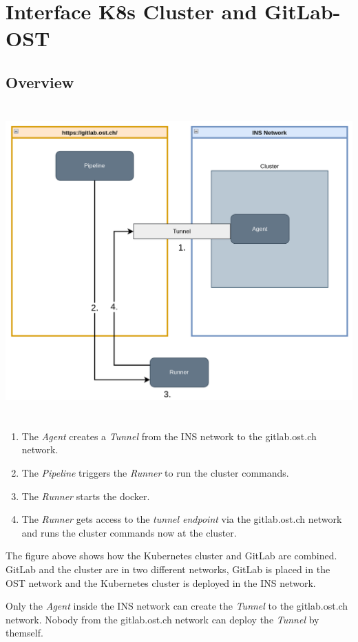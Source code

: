 \chapter{Interface K8s Cluster and GitLab-OST}

\section{Overview}
\includegraphics[height=12cm]{resources/k8s_including_in_gitlab-ost.png}
\begin{enumerate}
    \item The \textit{Agent} creates a \textit{Tunnel} from the INS network to the gitlab.ost.ch network.
    \item The \textit{Pipeline} triggers the \textit{Runner} to run the cluster commands.
    \item The \textit{Runner} starts the docker.
    \item The \textit{Runner} gets access to the \textit{tunnel endpoint} via the gitlab.ost.ch network and runs the cluster commands now at the cluster.
\end{enumerate}

\noindent The figure above shows how the Kubernetes cluster and GitLab are combined. GitLab and the cluster are in two different networks,  GitLab is placed in the OST network and the Kubernetes cluster is deployed in the INS network.

Only the \textit{Agent} inside the INS network can create the \textit{Tunnel} to the gitlab.ost.ch network. Nobody from the gitlab.ost.ch network can deploy the \textit{Tunnel} by themself.

